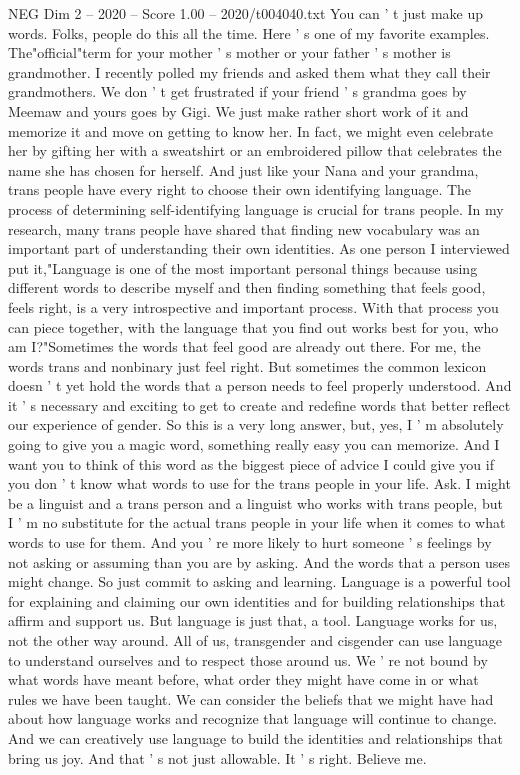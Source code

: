 \begin{textsample}{NEG Dim 2 – 2020 – Score 1.00 – 2020/t004040.txt}
You can ' t just make up words.
Folks, people do this all the time.
Here ' s one of my favorite examples.
The"official"term for your mother ' s mother or your father ' s mother is grandmother.
I recently polled my friends and asked them what they call their grandmothers.
We don ' t get frustrated if your friend ' s grandma goes by Meemaw and yours goes by Gigi.
We just make rather short work of it and memorize it and move on getting to know her.
In fact, we might even celebrate her by gifting her with a sweatshirt or an embroidered pillow that celebrates the name she has chosen for herself.
And just like your Nana and your grandma, trans people have every right to choose their own identifying language.
The process of determining self-identifying language is crucial for trans people.
In my research, many trans people have shared that finding new vocabulary was an important part of understanding their own identities.
As one person I interviewed put it,"Language is one of the most important personal things because using different words to describe myself and then finding something that feels good, feels right, is a very introspective and important process.
With that process you can piece together, with the language that you find out works best for you, who am I?"Sometimes the words that feel good are already out there.
For me, the words trans and nonbinary just feel right.
But sometimes the common lexicon doesn ' t yet hold the words that a person needs to feel properly understood.
And it ' s necessary and exciting to get to create and redefine words that better reflect our experience of gender.
So this is a very long answer, but, yes, I ' m absolutely going to give you a magic word, something really easy you can memorize.
And I want you to think of this word as the biggest piece of advice I could give you if you don ' t know what words to use for the trans people in your life.
Ask.
I might be a linguist and a trans person and a linguist who works with trans people, but I ' m no substitute for the actual trans people in your life when it comes to what words to use for them.
And you ' re more likely to hurt someone ' s feelings by not asking or assuming than you are by asking.
And the words that a person uses might change.
So just commit to asking and learning.
Language is a powerful tool for explaining and claiming our own identities and for building relationships that affirm and support us.
But language is just that, a tool.
Language works for us, not the other way around.
All of us, transgender and cisgender can use language to understand ourselves and to respect those around us.
We ' re not bound by what words have meant before, what order they might have come in or what rules we have been taught.
We can consider the beliefs that we might have had about how language works and recognize that language will continue to change.
And we can creatively use language to build the identities and relationships that bring us joy.
And that ' s not just allowable.
It ' s right.
Believe me.

\end{textsample}
